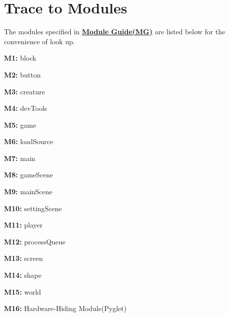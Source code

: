 \documentclass[12pt, titlepage]{article}
\begin{document}
		
\section{Trace to Modules}
The modules specified in \href{https://gitlab.cas.mcmaster.ca/wangs132/minecraft/-/blob/master/Doc/Design/MG/MG.pdf}{\bf Module Guide(MG)} are listed below for the convenience of look up.
\begin{description}

\item \textbf{M1:} block
\item \textbf{M2:} button
\item \textbf{M3:} creature
\item \textbf{M4:} devTools
\item \textbf{M5:} game
\item \textbf{M6:} loadSource
\item \textbf{M7:} main
\item \textbf{M8:} gameScene
\item \textbf{M9:} mainScene
\item \textbf{M10:} settingScene
\item \textbf{M11:} player
\item \textbf{M12:} processQueue
\item \textbf{M13:} screen
\item \textbf{M14:} shape
\item \textbf{M15:} world
\item \textbf{M16:} Hardware-Hiding Module(Pyglet)
\end{description}
\end{document}
